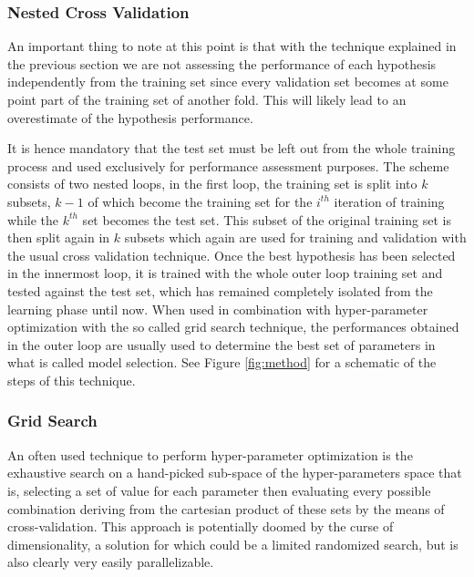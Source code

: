 \subsubsection{Nested Cross Validation}
\label{subsubsec:ncv}
An important thing to note at this point is that with the technique explained in
the previous section we are not assessing the performance of each hypothesis
independently from the training set since every validation set becomes at some
point part of the training set of another fold.
This will likely lead to an overestimate of the hypothesis performance.

It is hence mandatory that the test set must be left out from the whole training
process and used exclusively for performance assessment purposes.
The scheme consists of two nested loops, in the first loop, the training set
is split into $k$ subsets, $k-1$ of which become the training set for the
$i^{th}$ iteration of training while the $k^{th}$ set becomes the test set.
This subset of the original training set is then split again in $k$ subsets
which again are used for training and validation with the usual cross validation
technique.
Once the best hypothesis has been selected in the innermost loop, it is trained
with the whole outer loop training set and tested against the test set, which has
remained completely isolated from the learning phase until now.
When used in combination with hyper-parameter optimization with the so called grid
search technique, the performances obtained in the outer loop are usually used
to determine the best set of parameters in what is called model selection.
See Figure \ref{fig:method} for a schematic of the steps of this technique.

\subsubsection{Grid Search}
\label{subsubsec:grid}
An often used technique to perform hyper-parameter optimization is the exhaustive
search on a hand-picked sub-space of the hyper-parameters space that is, selecting
a set of value for each parameter then evaluating every possible combination
deriving from the cartesian product of these sets by the means of cross-validation.
This approach is potentially doomed by the curse of dimensionality, a solution
for which could be a limited randomized search, but is also clearly very easily
parallelizable.


